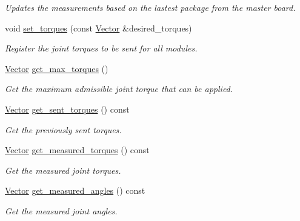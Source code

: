 \begin{DoxyCompactItemize}
\begin{DoxyCompactList}\small\item\em Updates the measurements based on the lastest package from the master board. \end{DoxyCompactList}\item 
void \hyperlink{classblmc__robots_1_1SpiJointModules_ad4abbcc6c228d823c06827093606983a}{set\+\_\+torques} (const \hyperlink{classblmc__robots_1_1SpiJointModules_a2d48f81ec41a42a240e80cd22d4fa2f8}{Vector} \&desired\+\_\+torques)
\begin{DoxyCompactList}\small\item\em Register the joint torques to be sent for all modules. \end{DoxyCompactList}\item 
\hyperlink{classblmc__robots_1_1SpiJointModules_a2d48f81ec41a42a240e80cd22d4fa2f8}{Vector} \hyperlink{classblmc__robots_1_1SpiJointModules_a84c6efc9eddde57a1409c724193f3c50}{get\+\_\+max\+\_\+torques} ()
\begin{DoxyCompactList}\small\item\em Get the maximum admissible joint torque that can be applied. \end{DoxyCompactList}\item 
\hyperlink{classblmc__robots_1_1SpiJointModules_a2d48f81ec41a42a240e80cd22d4fa2f8}{Vector} \hyperlink{classblmc__robots_1_1SpiJointModules_a90c7c0b7a4000dd0d9bb9ff2b14dd8c1}{get\+\_\+sent\+\_\+torques} () const 
\begin{DoxyCompactList}\small\item\em Get the previously sent torques. \end{DoxyCompactList}\item 
\hyperlink{classblmc__robots_1_1SpiJointModules_a2d48f81ec41a42a240e80cd22d4fa2f8}{Vector} \hyperlink{classblmc__robots_1_1SpiJointModules_af2502acd3208484ccc4172c025b4aea6}{get\+\_\+measured\+\_\+torques} () const 
\begin{DoxyCompactList}\small\item\em Get the measured joint torques. \end{DoxyCompactList}\item 
\hyperlink{classblmc__robots_1_1SpiJointModules_a2d48f81ec41a42a240e80cd22d4fa2f8}{Vector} \hyperlink{classblmc__robots_1_1SpiJointModules_ac22a3296f3cea39a837d8ee88e330137}{get\+\_\+measured\+\_\+angles} () const 
\begin{DoxyCompactList}\small\item\em Get the measured joint angles. \end{DoxyCompactList}\item 

\end{DoxyCompactItemize}
